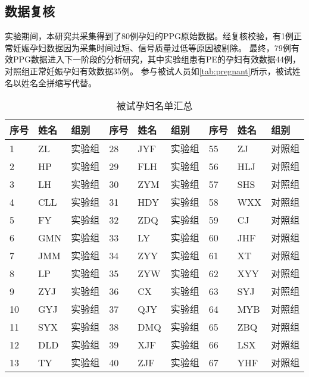 \subsection{数据复核}
实验期间，本研究共采集得到了80例孕妇的PPG原始数据。经复核校验，有1例正常妊娠孕妇数据因为采集时间过短、信号质量过低等原因被剔除。
最终，79例有效PPG数据进入下一阶段的分析研究，其中实验组患有PE的孕妇有效数据44例，对照组正常妊娠孕妇有效数据35例。
参与被试人员如\autoref{tab:pregnant}所示，被试姓名以姓名全拼缩写代替。
\begin{table}[htbp]
      \centering
      \caption{\label{tab:pregnant}被试孕妇名单汇总}
      \begin{tabularx}{\linewidth}{X<{\centering}X<{\centering}X<{\centering}X<{\centering}X<{\centering}X<{\centering}X<{\centering}X<{\centering}X<{\centering}}
      \toprule
      \textbf{序号} & \textbf{姓名} & \textbf{组别} & \textbf{序号} & \textbf{姓名} & \textbf{组别} & \textbf{序号} & \textbf{姓名} & \textbf{组别} \\
      \midrule
      1     & ZL    & 实验组   & 28    & JYF   & 实验组   & 55    & ZJ    & 对照组 \\
      2     & HP    & 实验组   & 29    & FLH   & 实验组   & 56    & HLJ   & 对照组 \\
      3     & LH    & 实验组   & 30    & ZYM   & 实验组   & 57    & SHS   & 对照组 \\
      4     & CLL   & 实验组   & 31    & HDY   & 实验组   & 58    & WXX   & 对照组 \\
      5     & FY    & 实验组   & 32    & ZDQ   & 实验组   & 59    & CJ    & 对照组 \\
      6     & GMN   & 实验组   & 33    & LY    & 实验组   & 60    & JHF   & 对照组 \\
      7     & JMM   & 实验组   & 34    & ZYY   & 实验组   & 61    & XT    & 对照组 \\
      8     & LP    & 实验组   & 35    & ZYW   & 实验组   & 62    & XYY   & 对照组 \\
      9     & ZYJ   & 实验组   & 36    & CX    & 实验组   & 63    & SYJ   & 对照组 \\
      10    & GYJ   & 实验组   & 37    & QJY   & 实验组   & 64    & MYB   & 对照组 \\
      11    & SYX   & 实验组   & 38    & DMQ   & 实验组   & 65    & ZBQ   & 对照组 \\
      12    & DLD   & 实验组   & 39    & XJF   & 实验组   & 66    & LSX   & 对照组 \\
      13    & TY    & 实验组   & 40    & ZJF   & 实验组   & 67    & YHF   & 对照组 \\

\end{tabularx}
\end{table}
